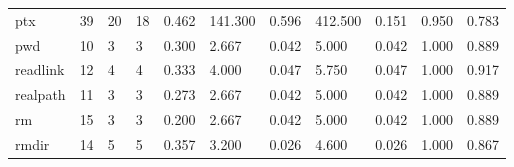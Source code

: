 \begin{longtable}{lp{1.8cm}p{1.8cm}p{1.8cm}p{1.8cm}p{1.8cm}p{1.8cm}p{1.8cm}p{1.8cm}p{1.8cm}p{1.8cm}}
ptx       &                           39 &                 20 &                                18 &                                      0.462 &                                141.300 &                                        0.596 &                           412.500 &                                   0.151 &                              0.950 &                                              0.783 \\
pwd       &                           10 &                  3 &                                 3 &                                      0.300 &                                  2.667 &                                        0.042 &                             5.000 &                                   0.042 &                              1.000 &                                              0.889 \\
readlink  &                           12 &                  4 &                                 4 &                                      0.333 &                                  4.000 &                                        0.047 &                             5.750 &                                   0.047 &                              1.000 &                                              0.917 \\
realpath  &                           11 &                  3 &                                 3 &                                      0.273 &                                  2.667 &                                        0.042 &                             5.000 &                                   0.042 &                              1.000 &                                              0.889 \\
rm        &                           15 &                  3 &                                 3 &                                      0.200 &                                  2.667 &                                        0.042 &                             5.000 &                                   0.042 &                              1.000 &                                              0.889 \\
rmdir     &                           14 &                  5 &                                 5 &                                      0.357 &                                  3.200 &                                        0.026 &                             4.600 &                                   0.026 &                              1.000 &                                              0.867 \\

\end{longtable}
